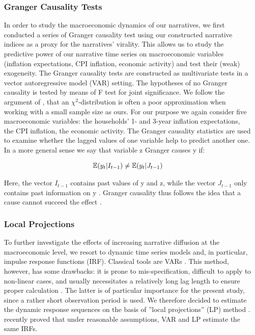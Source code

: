 \subsubsection{Granger Causality Tests}

In order to study the macroeconomic dynamics of our narratives, we first conducted a series of Granger causality test using our constructed narrative indices as a proxy for the narratives' virality. This allows us to study the predictive power of our narrative time series on macroeconomic variables (inflation expectations, CPI inflation, economic activity) and test their (weak) exogeneity. The Granger causality tests are constructed as multivariate tests in a vector autoregressive model (VAR) setting. The hypotheses of no Granger causality is tested by means of F test for joint significance. We follow the argument of \cite{Luetkepohl.2005}, that an $\chi^2$-distribution is often a poor approximation when working with a small sample size as ours. For our purpose we again consider five macroeconomic variables: the households' 1- and 3-year inflation expectations, the CPI inflation, the economic activity. The Granger causality statistics are used to examine whether the lagged values of one variable help to predict another one. In a more general sense we say that variable z Granger causes y if:

\begin{equation}
	\operatorname*{\mathbb{E}}(y_t|I_{t-1}) \neq \operatorname*{\mathbb{E}}(y_t|J_{t-1})
\end{equation}

\noindent Here, the vector $I_{t-1}$ contains past values of y and z, while the vector $J_{t-1}$ only contains past information on y \citep{wooldridge.2013}. Granger causality thus follows the idea that a cause cannot succeed the effect \citep[41]{Luetkepohl.2005}. 

\subsubsection{Local Projections}

To further investigate the effects of increasing narrative diffusion at the macroeconomic level, we resort to dynamic time series models and, in particular, impulse response functions (IRF). Classical tools are VARs \citep{Sims.1980}. This method, however, has some drawbacks: it is prone to mis-specification, difficult to apply to non-linear cases, and usually necessitates a relatively long lag length to ensure proper calculation \citep[161]{Jorda.2005}. The latter is of particular importance for the present study, since a rather short observation period is used. We therefore decided to estimate the dynamic response sequences on the basis of ''local projections'' (LP) method \citep{Jorda.2005}. \cite{Plagborg.2021} recently proved that under reasonable assumptions, VAR and LP estimate the same IRFs.

